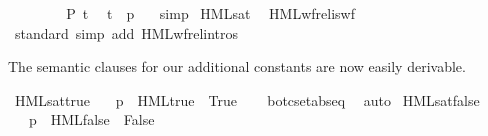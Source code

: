 \begin{isabellebody}
\ \ \ \ \isamarkupfalse%
\isanewline
\ \ \isamarkupfalse%
\ {\isacartoucheopen}P\ t{\isacartoucheclose}\ \isamarkupfalse%
\ {\isacartoucheopen}t\ {\isacharequal}{\kern0pt}\ {\isacharparenleft}{\kern0pt}p{\isacharcomma}{\kern0pt}\ {\isasymphi}{\isacharparenright}{\kern0pt}{\isacartoucheclose}\ \isamarkupfalse%
\ simp\isanewline
{}\isamarkupfalse%
%
\endisatagproof
{\isafoldproof}%
%
\isadelimproof
\isanewline
%
\endisadelimproof
%
\isadelimvisible
\isanewline
%
\endisadelimvisible
%
\isatagvisible
{}\isamarkupfalse%
\ HML{\isacharunderscore}{\kern0pt}sat\ \isamarkupfalse%
\ HML{\isacharunderscore}{\kern0pt}wf{\isacharunderscore}{\kern0pt}rel{\isacharunderscore}{\kern0pt}is{\isacharunderscore}{\kern0pt}wf\ \isanewline
\ \ \isamarkupfalse%
\ {\isacharparenleft}{\kern0pt}standard{\isacharcomma}{\kern0pt}\ {\isacharparenleft}{\kern0pt}simp\ add{\isacharcolon}{\kern0pt}\ HML{\isacharunderscore}{\kern0pt}wf{\isacharunderscore}{\kern0pt}rel{\isachardot}{\kern0pt}intros{\isacharparenright}{\kern0pt}{\isacharplus}{\kern0pt}{\isacharparenright}{\kern0pt}%
\endisatagvisible
{\isafoldvisible}%
%
\isadelimvisible
%
\endisadelimvisible
%
\begin{isamarkuptext}%
The semantic clauses for our additional constants are now easily derivable.%
\end{isamarkuptext}\isamarkuptrue%
\isamarkupfalse%
\ HML{\isacharunderscore}{\kern0pt}sat{\isacharunderscore}{\kern0pt}true{\isacharcolon}{\kern0pt}\isanewline
\ \ \ {\isacartoucheopen}{\isacharparenleft}{\kern0pt}p\ {\isasymTurnstile}\ HML{\isacharunderscore}{\kern0pt}true{\isacharparenright}{\kern0pt}\ {\isacharequal}{\kern0pt}\ True{\isacartoucheclose}\isanewline
%
\isadelimproof
\ \ %
\endisadelimproof
%
\isatagproof
{}\isamarkupfalse%
\ bot{\isacharunderscore}{\kern0pt}cset{\isachardot}{\kern0pt}abs{\isacharunderscore}{\kern0pt}eq\ \isamarkupfalse%
\ auto%
\endisatagproof
{\isafoldproof}%
%
\isadelimproof
\isanewline
%
\endisadelimproof
{}\isamarkupfalse%
\ HML{\isacharunderscore}{\kern0pt}sat{\isacharunderscore}{\kern0pt}false{\isacharcolon}{\kern0pt}\isanewline
\ \ \ {\isacartoucheopen}{\isacharparenleft}{\kern0pt}p\ {\isasymTurnstile}\ HML{\isacharunderscore}{\kern0pt}false{\isacharparenright}{\kern0pt}\ {\isacharequal}{\kern0pt}\ False{\isacartoucheclose}\isanewline
%
\isadelimproof
\ \ %
\endisadelimproof
%
\isatagproof

\end{isabellebody}
